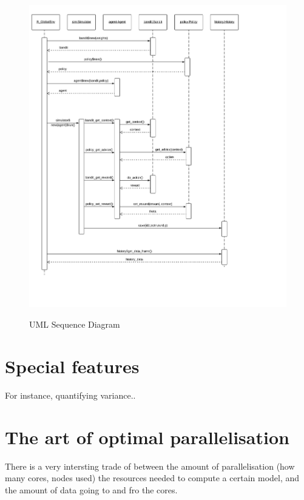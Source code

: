\documentclass[nojss]{jss}\usepackage[]{graphicx}\usepackage[]{color}
\begin{document}
\begin{figure}[H]
  \centering
    \includegraphics[width=.99\textwidth]{fig/contextual_sequence}
    \label{fig:contextual_sequence}
      \caption{ UML Sequence Diagram}
\end{figure}

\section{Special features}

For instance, quantifying variance..

\section{The art of optimal parallelisation}

There is a very intersting trade of between the amount of parallelisation (how many cores, nodes used) the resources needed to compute a certain model, and the amount of data going to and fro the cores.
\end{document}
